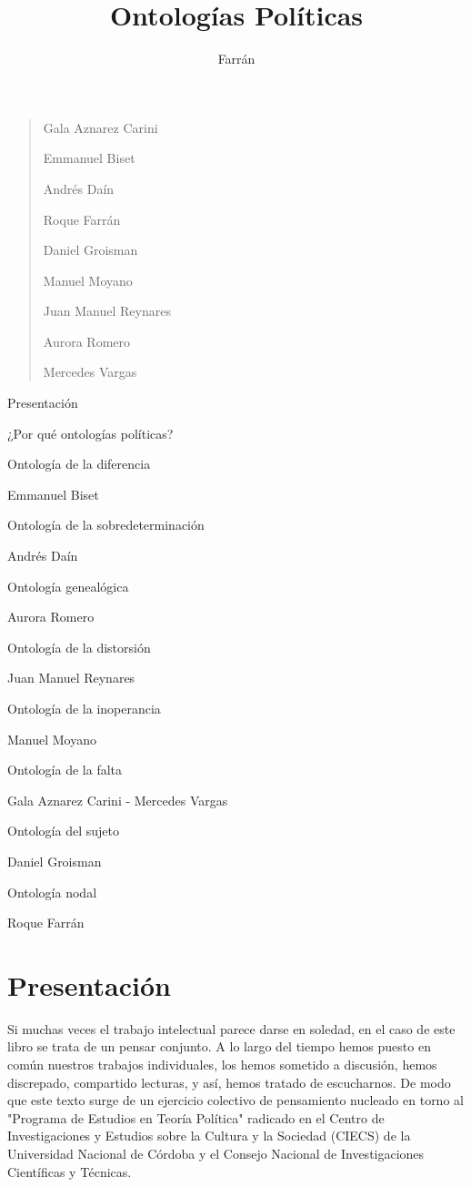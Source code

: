 \documentclass{book}
\title{Ontologías Políticas}
\author{Farrán}
\date{}
\begin{document}
\justifying
\maketitle

\begin{quote}
Gala Aznarez Carini

Emmanuel Biset

Andrés Daín

Roque Farrán

Daniel Groisman

Manuel Moyano

Juan Manuel Reynares

Aurora Romero

Mercedes Vargas
\end{quote}

\tableofcontents

Presentación

¿Por qué ontologías políticas?

Ontología de la diferencia

Emmanuel Biset

Ontología de la sobredeterminación

Andrés Daín

Ontología genealógica

Aurora Romero

Ontología de la distorsión

Juan Manuel Reynares

Ontología de la inoperancia

Manuel Moyano

Ontología de la falta

Gala Aznarez Carini - Mercedes Vargas

Ontología del sujeto

Daniel Groisman

Ontología nodal

Roque Farrán

\chapter*{Presentación}

Si muchas veces el trabajo intelectual parece darse en soledad, en el
caso de este libro se trata de un pensar conjunto. A lo largo del tiempo
hemos puesto en común nuestros trabajos individuales, los hemos sometido
a discusión, hemos discrepado, compartido lecturas, y así, hemos tratado
de escucharnos. De modo que este texto surge de un ejercicio colectivo
de pensamiento nucleado en torno al "Programa de Estudios en Teoría
Política" radicado en el Centro de Investigaciones y Estudios sobre la
Cultura y la Sociedad (CIECS) de la Universidad Nacional de Córdoba y el
Consejo Nacional de Investigaciones Científicas y Técnicas.
\end{document}
